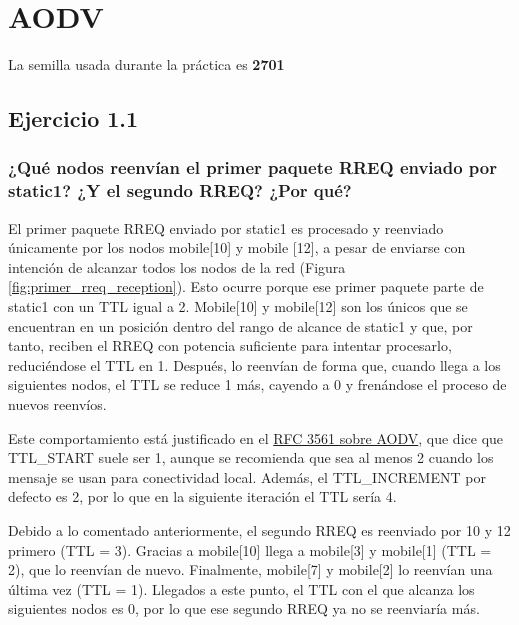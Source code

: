\chapter{AODV}
\label{chap:aodv}

\vspace{-0.5cm}
\tcolorbox[colback=yellow!20, colframe=yellow!75!black, title=Nota]
La semilla usada durante la práctica es \textbf{2701}
\endtcolorbox
\vspace{1cm}


\section{Ejercicio 1.1}

\subsection{¿Qué nodos reenvían el primer paquete RREQ enviado por static1? ¿Y el segundo RREQ? ¿Por qué?}

El primer paquete RREQ enviado por static1 es procesado y reenviado únicamente por los nodos mobile[10] y mobile [12], a pesar de enviarse con intención de alcanzar todos los nodos de la red (Figura \ref{fig:primer_rreq_reception}). Esto ocurre porque ese primer paquete parte de static1 con un TTL igual a 2. Mobile[10] y mobile[12] son los únicos que se encuentran en un posición dentro del rango de alcance de static1 y que, por tanto, reciben el RREQ con potencia suficiente para intentar procesarlo, reduciéndose el TTL en 1. Después, lo reenvían de forma que, cuando llega a los siguientes nodos, el TTL se reduce 1 más, cayendo a 0 y frenándose el proceso de nuevos reenvíos.

Este comportamiento está justificado en el \href{https://datatracker.ietf.org/doc/html/rfc3561}{RFC 3561 sobre AODV}, que dice que TTL\_START suele ser 1, aunque se recomienda que sea al menos 2 cuando los mensaje se usan para conectividad local. Además, el TTL\_INCREMENT por defecto es 2, por lo que en la siguiente iteración el TTL sería 4.

Debido a lo comentado anteriormente, el segundo RREQ es reenviado por 10 y 12 primero (TTL = 3). Gracias a mobile[10] llega a mobile[3] y mobile[1] (TTL = 2), que lo reenvían de nuevo. Finalmente, mobile[7] y mobile[2] lo reenvían una última vez (TTL = 1). Llegados a este punto, el TTL con el que alcanza los siguientes nodos es 0, por lo que ese segundo RREQ ya no se reenviaría más.

